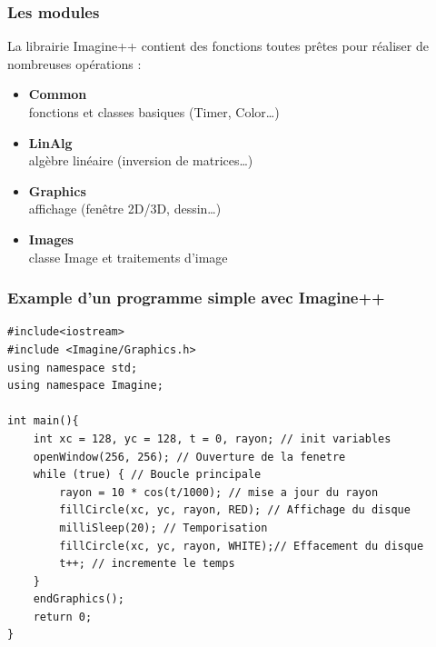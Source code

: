 \begin{frame}
\frametitle{Les modules}
La librairie Imagine++ contient des fonctions toutes prêtes pour réaliser de nombreuses opérations :
\begin{itemize}
\item \textbf{Common}\\ fonctions et classes basiques (Timer, Color\dots)
\item \textbf{LinAlg}\\ algèbre linéaire (inversion de matrices\dots)
\item \textbf{Graphics}\\ affichage (fenêtre 2D/3D, dessin\dots)
\item \textbf{Images}\\ classe Image et traitements d'image
\end{itemize}
\end{frame}

\begin{frame}[fragile]
\frametitle{Example d'un programme simple avec Imagine++}
\begin{verbatim}
#include<iostream>
#include <Imagine/Graphics.h>
using namespace std;
using namespace Imagine;

int main(){
    int xc = 128, yc = 128, t = 0, rayon; // init variables
    openWindow(256, 256); // Ouverture de la fenetre
    while (true) { // Boucle principale
        rayon = 10 * cos(t/1000); // mise a jour du rayon
        fillCircle(xc, yc, rayon, RED); // Affichage du disque
        milliSleep(20); // Temporisation
        fillCircle(xc, yc, rayon, WHITE);// Effacement du disque	
        t++; // incremente le temps
    }
    endGraphics();
    return 0;
}
\end{verbatim}
\end{frame}


